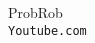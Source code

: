 \documentclass[12pt]{report}                                %
\begin{document}
        
        


\clearpage

    \begin{thebibliography}{9}

        ProbRob
        \\\texttt{Youtube.com}


     

\end{thebibliography}
\end{document}
